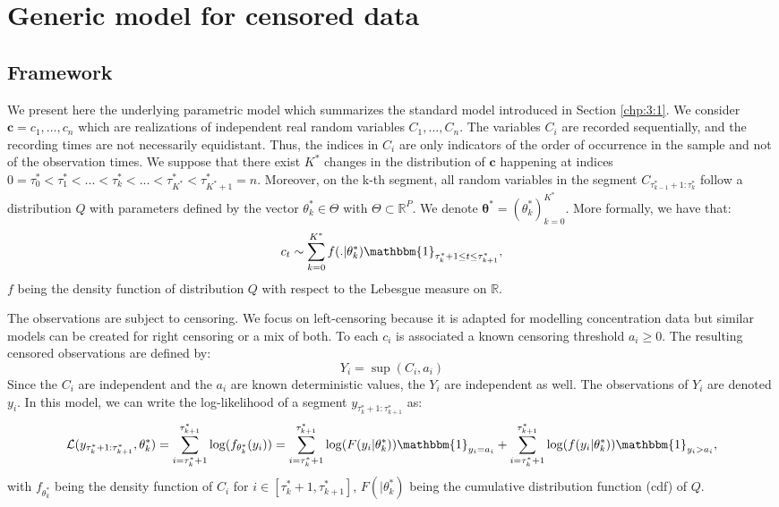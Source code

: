 \section{Generic model for censored data}\label{chp:4:1}

\subsection{Framework}

We present here the underlying parametric model which summarizes the standard model introduced in Section \ref{chp:3:1}. We consider $\bm c = c_1,\dots,c_n$ which are realizations of independent real random variables $C_1,\dots,C_n$. The variables $C_i$ are recorded sequentially, and the recording times are not necessarily equidistant. Thus, the indices in $C_i$ are only indicators of the order of occurrence in the sample and not of the observation times. We suppose that there exist $K^*$ changes in the distribution of $\bm c$ happening at indices $0=\tau_0^*<\tau^*_1 <... < \tau^*_k <... < \tau^*_{K^*}<\tau^*_{K^*+1}=n$. Moreover, on the k-th segment, all random variables in the segment $C_{\tau^*_{k-1}+1:\tau^*_{k}}$ follow a distribution $Q$ with parameters defined by the vector $\theta^*_k\in\Theta$ with $\Theta\subset\mathbb{R}^P$. We denote $\bm{\theta^*} = (\theta^*_k)_{k=0}^{K^*}$. More formally, we have that:  
$$c_t \sim \sum_{k=0}^{K^*} f(.\vert\theta^*_k)\mathbbm{1}_{\tau^*_{k}+1\leq t \leq \tau^*_{k+1}},$$
$f$ being the density function of distribution $Q$ with respect to the Lebesgue measure on $\mathbb{R}$.  


The observations are subject to censoring. We focus on left-censoring because it is adapted for modelling concentration data but similar models can be created for right censoring or a mix of both. To each $c_i$ is associated a known censoring threshold $a_i \ge 0$. The resulting censored observations are defined by:  
\begin{equation}\label{chp:4:defy}
Y_i = \sup(C_i,a_i)
\end{equation}
Since the $C_i$ are independent and the $a_i$ are known deterministic values, the $Y_i$ are independent as well. The observations of $Y_i$ are denoted $y_i$. In this model, we can write the log-likelihood of a segment $y_{\tau^*_k+1:\tau^*_{k+1}}$ as:  
\begin{equation}\label{chp:4:loglik}
\mathcal{L}(y_{\tau^*_k+1:\tau^*_{k+1}},\theta^*_k) = \sum_{i = \tau^*_k+1}^{\tau^*_{k+1}}\log(f_{\theta^*_k}(y_i)) = \sum_{i = \tau^*_k+1}^{\tau^*_{k+1}}\log(F(y_i\vert\theta^*_k))\mathbbm{1}_{y_i=a_i}+\sum_{i = \tau^*_k+1}^{\tau^*_{k+1}}\log(f(y_i \vert\theta^*_k))\mathbbm{1}_{y_i>a_i},
\end{equation}
with $f_{\theta^*_k}$ being the density function of $C_i$ for $i \in [\tau^*_k+1,\tau^*_{k+1}]$, $F(\vert\theta^*_k)$ being the cumulative distribution function (cdf) of $Q$. 


